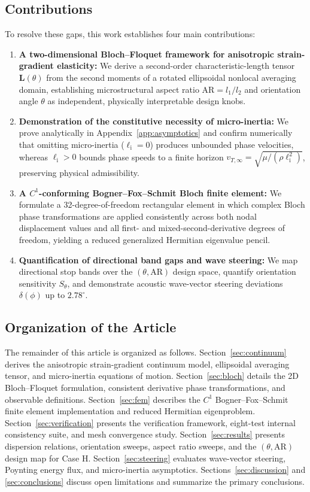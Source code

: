\subsection{Contributions}
To resolve these gaps, this work establishes four main contributions:
\begin{enumerate}[label=\textbf{C\arabic*.}]
  \item \textbf{A two-dimensional Bloch--Floquet framework for anisotropic strain-gradient elasticity:} We derive a second-order characteristic-length tensor $\mathbf{L}(\theta)$ from the second moments of a rotated ellipsoidal nonlocal averaging domain, establishing microstructural aspect ratio $\mathrm{AR} = l_1/l_2$ and orientation angle $\theta$ as independent, physically interpretable design knobs.
  \item \textbf{Demonstration of the constitutive necessity of micro-inertia:} We prove analytically in Appendix~\ref{app:asymptotics} and confirm numerically that omitting micro-inertia ($\ell_{\mathrm{i}} = 0$) produces unbounded phase velocities, whereas $\ell_{\mathrm{i}} > 0$ bounds phase speeds to a finite horizon $v_{T,\infty} = \sqrt{\mu/(\rho \ell_{\mathrm{i}}^2)}$, preserving physical admissibility.
  \item \textbf{A $C^1$-conforming Bogner--Fox--Schmit Bloch finite element:} We formulate a 32-degree-of-freedom rectangular element in which complex Bloch phase transformations are applied consistently across both nodal displacement values and all first- and mixed-second-derivative degrees of freedom, yielding a reduced generalized Hermitian eigenvalue pencil.
  \item \textbf{Quantification of directional band gaps and wave steering:} We map directional stop bands over the $(\theta, \mathrm{AR})$ design space, quantify orientation sensitivity $S_\theta$, and demonstrate acoustic wave-vector steering deviations $\delta(\phi)$ up to $2.78^\circ$.
\end{enumerate}

\subsection{Organization of the Article}
The remainder of this article is organized as follows. Section~\ref{sec:continuum} derives the anisotropic strain-gradient continuum model, ellipsoidal averaging tensor, and micro-inertia equations of motion. Section~\ref{sec:bloch} details the 2D Bloch--Floquet formulation, consistent derivative phase transformations, and observable definitions. Section~\ref{sec:fem} describes the $C^1$ Bogner--Fox--Schmit finite element implementation and reduced Hermitian eigenproblem. Section~\ref{sec:verification} presents the verification framework, eight-test internal consistency suite, and mesh convergence study. Section~\ref{sec:results} presents dispersion relations, orientation sweeps, aspect ratio sweeps, and the $(\theta, \mathrm{AR})$ design map for Case H. Section~\ref{sec:steering} evaluates wave-vector steering, Poynting energy flux, and micro-inertia asymptotics. Sections~\ref{sec:discussion} and \ref{sec:conclusions} discuss open limitations and summarize the primary conclusions.
